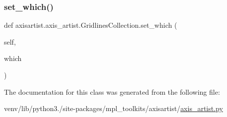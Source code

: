\mbox{\label{classaxisartist_1_1axis__artist_1_1GridlinesCollection_a6b4285049d60e97073b6723f86a65060}} 
\subsubsection{\texorpdfstring{set\+\_\+which()}{set\_which()}}
{\footnotesize\ttfamily def axisartist.\+axis\+\_\+artist.\+Gridlines\+Collection.\+set\+\_\+which (\begin{DoxyParamCaption}\item[{}]{self,  }\item[{}]{which }\end{DoxyParamCaption})}



The documentation for this class was generated from the following file\+:\begin{DoxyCompactItemize}
\item 
venv/lib/python3./site-\/packages/mpl\+\_\+toolkits/axisartist/\hyperlink{axisartist_2axis__artist_8py}{axis\+\_\+artist.\+py}\end{DoxyCompactItemize}
